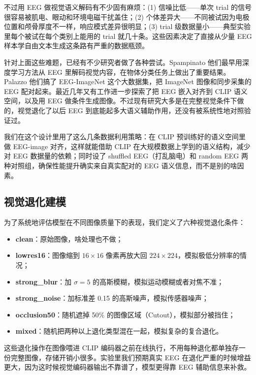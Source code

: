 不过用 EEG 做视觉语义解码有不少固有麻烦：(1) 信噪比低——单次 trial 的信号很容易被肌电、眼动和环境电磁干扰盖住；(2) 个体差异大——不同被试因为电极位置和颅骨厚度不一样，响应模式差异很明显；(3) trial 级数据量小——典型实验里每个被试在每个类别上能用的 trial 就几十条。这些因素决定了直接从少量 EEG 样本学自由文本生成这条路有严重的数据瓶颈。

针对上面这些难题，已经有不少研究者做了各种尝试。Spampinato 他们最早用深度学习方法从 EEG 里解码视觉内容，在物体分类任务上做出了重要结果。Palazzo 他们搞了 EEG-ImageNet 这个大数据集，把 ImageNet 图像和同步采集的 EEG 配对起来。最近几年又有工作进一步探索了把 EEG 嵌入对齐到 CLIP 语义空间，以及用 EEG 做条件生成图像。不过现有研究大多是在完整视觉条件下做的，视觉退化了以后 EEG 到底能起多大语义辅助作用，还没有被系统性地对照验证过。

我们在这个设计里用了这么几条数据利用策略：在 CLIP 预训练好的语义空间里做 EEG-image 对齐，这样就能借助 CLIP 在大规模数据上学到的语义结构，减少对 EEG 数据量的依赖；同时设了 shuffled EEG（打乱脑电）和 random EEG 两种对照组，确保性能提升确实来自真实配对的 EEG 语义信息，而不是别的啥因素。

\subsection{视觉退化建模}

为了系统地评估模型在不同图像质量下的表现，我们定义了六种视觉退化条件：

\begin{itemize}
  \item \textbf{clean}：原始图像，啥处理也不做；
  \item \textbf{lowres16}：图像缩到 $16\times16$ 像素再放大回 $224\times224$，模拟极低分辨率的情况；
  \item \textbf{strong\_blur}：加 $\sigma=5$ 的高斯模糊，模拟运动模糊或者对焦不准；
  \item \textbf{strong\_noise}：加标准差 0.15 的高斯噪声，模拟传感器噪声；
  \item \textbf{occlusion50}：随机遮掉 50\% 的图像区域（Cutout），模拟部分被挡住；
  \item \textbf{mixed}：随机把两种以上退化类型混在一起，模拟复杂的复合退化。
\end{itemize}

这些退化操作在图像喂进 CLIP 编码器之前在线执行，不用每种退化都单独存一份完整图像，存储开销小很多。实验里我们预期真实 EEG 在退化严重的时候增益更大，因为这时候视觉编码器输出不靠谱了，模型更得靠 EEG 辅助信息来补救。

